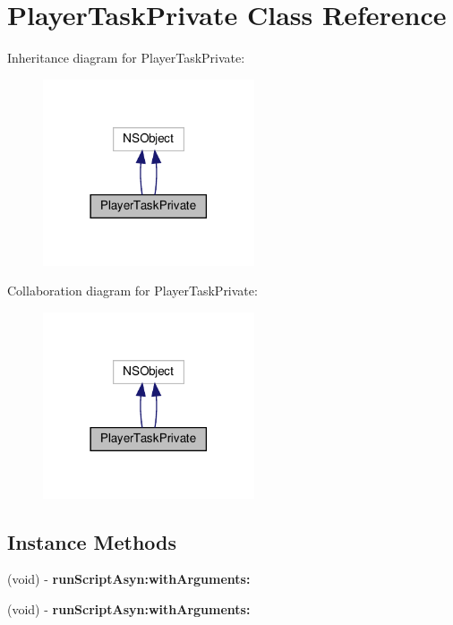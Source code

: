 \hypertarget{interfacePlayerTaskPrivate}{}\section{Player\+Task\+Private Class Reference}
\label{interfacePlayerTaskPrivate}


Inheritance diagram for Player\+Task\+Private\+:
\nopagebreak
\begin{figure}[H]
\begin{center}
\leavevmode
\includegraphics[width=177pt]{interfacePlayerTaskPrivate__inherit__graph}
\end{center}
\end{figure}


Collaboration diagram for Player\+Task\+Private\+:
\nopagebreak
\begin{figure}[H]
\begin{center}
\leavevmode
\includegraphics[width=177pt]{interfacePlayerTaskPrivate__coll__graph}
\end{center}
\end{figure}
\subsection*{Instance Methods}
\begin{DoxyCompactItemize}
\item 
\mbox{\label{interfacePlayerTaskPrivate_adaa67ab9e98eb7298299b0ec05820dea}} 
(void) -\/ {\bfseries run\+Script\+Asyn\+:with\+Arguments\+:}
\item 
\mbox{\label{interfacePlayerTaskPrivate_adaa67ab9e98eb7298299b0ec05820dea}} 
(void) -\/ {\bfseries run\+Script\+Asyn\+:with\+Arguments\+:}
\end{DoxyCompactItemize}
